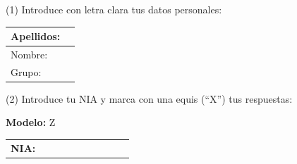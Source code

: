 \documentclass[a4paper,11pt]{article}
\begin{document}
\vspace{0.2cm}


\begin{center}
(1) Introduce con letra clara tus datos personales:
\end{center}

\begin{center}
\large

\begin{tabular}{|l|p{12cm}|}
\hline
Apellidos:   &  \\
\hline
Nombre: &    \\
\hline
Grupo:   &  \\
\hline
\end{tabular}
\end{center}

\vspace{0.2cm}

\begin{center}
(2) Introduce tu NIA y marca con una equis (``X'') tus respuestas:
\end{center}

\begin{center}
\large
\textbf{Modelo:} Z
\end{center}

\begin{center}
\Large
\begin{tabular}{l|p{0.3cm}|p{0.3cm}|p{0.3cm}|p{0.3cm}|p{0.3cm}|p{0.3cm}|p{0.3cm}|p{0.3cm}|p{0.3cm}|}
\cline{2-10}
\textbf{NIA:} & & & & & & & & & \\
\cline{2-10}
\end{tabular}
\end{center}
\end{document}
